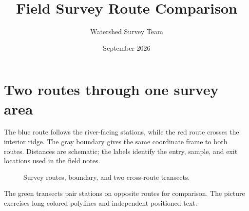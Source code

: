 \documentclass{article}
\title{Field Survey Route Comparison}
\author{Watershed Survey Team}
\date{September 2026}
\begin{document}
\maketitle

\section{Two routes through one survey area}
The blue route follows the river-facing stations, while the red route
crosses the interior ridge. The gray boundary gives the same coordinate
frame to both routes. Distances are schematic; the labels identify the
entry, sample, and exit locations used in the field notes.

\begin{figure}
\centering
{}
\caption{Survey routes, boundary, and two cross-route transects.}
\label{fig:survey-routes}
\end{figure}

The green transects pair stations on opposite routes for comparison.
The picture exercises long colored polylines and independent positioned text.
\end{document}
